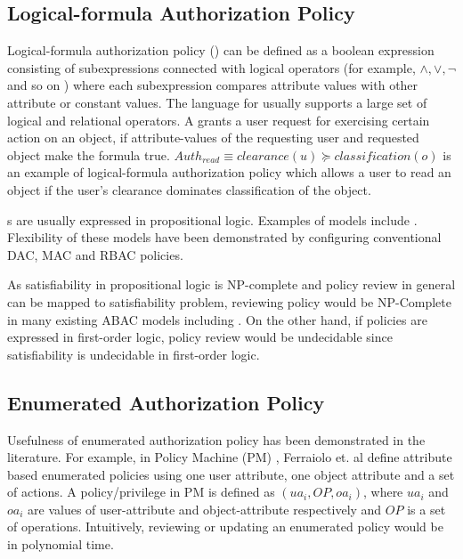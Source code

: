 \subsection{Logical-formula Authorization Policy}
	Logical-formula authorization policy (\LAP{}) can be defined as a boolean expression consisting of subexpressions connected with logical operators (for example, $\land, \lor, \lnot$ and so on ) where each subexpression compares attribute values with other attribute or constant values. The language for \LAP{} usually supports a large set of logical and relational operators. A \LAP{} grants a user request for exercising certain action on an object, if attribute-values of the requesting user and requested object make the formula true. $Auth_{read} \equiv clearance(u) \succeq classification(o)$ is an example of  logical-formula authorization policy which allows a user to read an object if the user's clearance dominates classification of the object.
	
	\LAP{}s are usually expressed in propositional logic. Examples of  \LPModels{} models  include \cite{abacAlpha,hgabac,abac-ws,abac-for-web-service}.  Flexibility of these models have been demonstrated by configuring conventional DAC\cite{dac}, MAC\cite{lbac} and RBAC \cite{rbac} policies. 
	
	
	As satisfiability in propositional logic is NP-complete and policy review in general can be mapped to satisfiability problem, reviewing policy would be NP-Complete in many existing ABAC models including \cite{abacAlpha,hgabac,abac-for-web-service}. On the other hand, if policies are expressed in first-order logic, policy review would be undecidable since  satisfiability is undecidable in first-order logic.
	
\subsection{Enumerated Authorization Policy}
	Usefulness of enumerated authorization policy has been demonstrated in the literature. For example, in Policy Machine (PM) \cite{policy-machine}, Ferraiolo et. al define attribute based enumerated policies using one user attribute, one object attribute and a set of actions. A policy/privilege in PM is defined as $(ua_i, OP, oa_i)$, where $ua_i$ and $oa_i$ are values of user-attribute and object-attribute respectively and $OP$ is  a set of operations. Intuitively, reviewing or updating an enumerated policy would be in polynomial time.
		
